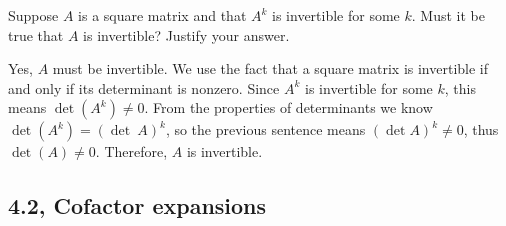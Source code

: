 \begin{problems}
\problem %
Suppose $A$ is a square matrix and that $A^k$ is invertible for some $k$.  Must
it be true that $A$ is invertible?  Justify your answer.

\begin{solution}
  Yes, $A$ must be invertible.  We use the fact that a square matrix is
  invertible if and only if its determinant is nonzero.  Since $A^k$ is
  invertible for some $k$, this means $\det(A^k) \neq 0$.  From the properties
  of determinants we know $\det(A^k) = (\det \ A)^k$, so the previous sentence
  means $(\det A)^k \neq 0$, thus $\det(A) \neq 0$.  Therefore, $A$ is
  invertible.
\end{solution}
\end{problems}\setcounter{problem}{0}

\newpage

\subsection{4.2, Cofactor expansions}

